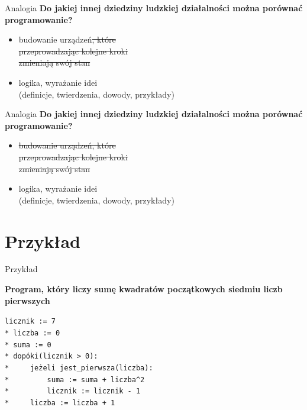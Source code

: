 \documentclass{beamer}
\begin{document}
\begin{frame}{Analogia}
  \textbf{Do jakiej innej dziedziny ludzkiej działalności
    można porównać programowanie?}
  \begin{itemize}
  \item budowanie urządzeń\sout{, które \\
    przeprowadzając kolejne kroki} \\
    \sout{zmieniają swój stan}
  \item logika, wyrażanie idei \\
    (definicje, twierdzenia, dowody, przykłady)
  \end{itemize}
\end{frame}


\begin{frame}{Analogia}
  \textbf{Do jakiej innej dziedziny ludzkiej działalności
    można porównać programowanie?}
  \begin{itemize}
  \item \sout{budowanie urządzeń}\sout{, które \\
      przeprowadzając kolejne kroki} \\
    \sout{zmieniają swój stan}
  \item logika, wyrażanie idei \\
    (definicje, twierdzenia, dowody, przykłady)
  \end{itemize}
\end{frame}

\section{Przykład}

\begin{frame}{Przykład}

  \textbf{Program, który liczy sumę kwadratów
    początkowych siedmiu liczb pierwszych}

  \pause
  \texttt{licznik := 7\\*
liczba := 0\\*
suma := 0\\*
dopóki(licznik > 0):\\*
\ \ \ \ jeżeli jest\_pierwsza(liczba):\\*
\ \ \ \ \ \ \ \ suma := suma + liczba\^{}2\\*
\ \ \ \ \ \ \ \ licznik := licznik - 1\\*
\ \ \ \ liczba := liczba + 1
  }
   
\end{frame}
\end{document}
